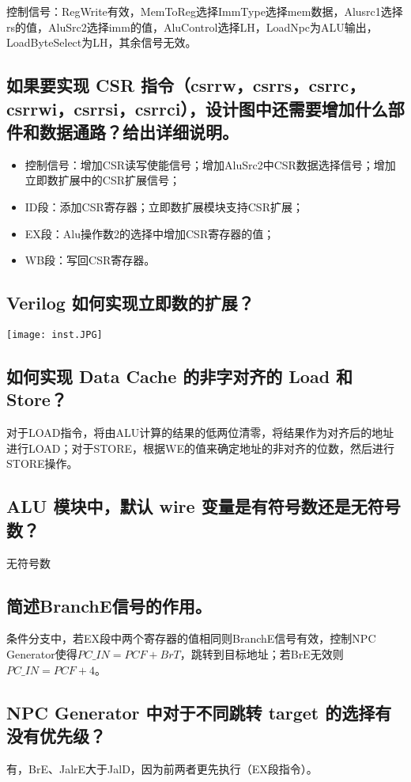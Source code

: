\documentclass[UTF8]{ctexart}
\begin{document}
	控制信号：RegWrite有效，MemToReg选择ImmType选择mem数据，Alusrc1选择rs的值，AluSrc2选择imm的值，AluControl选择LH，LoadNpc为ALU输出，LoadByteSelect为LH，其余信号无效。
	
	\subsection{如果要实现 CSR 指令（csrrw，csrrs，csrrc，csrrwi，csrrsi，csrrci），设计图中还需要增加什么部件和数据通路？给出详细说明。}
	\begin{itemize}
		\item 控制信号：增加CSR读写使能信号；增加AluSrc2中CSR数据选择信号；增加立即数扩展中的CSR扩展信号；
		\item ID段：添加CSR寄存器；立即数扩展模块支持CSR扩展；
		\item EX段：Alu操作数2的选择中增加CSR寄存器的值；
		\item WB段：写回CSR寄存器。
	\end{itemize}

	\subsection{Verilog 如何实现立即数的扩展？}
	\begin{center}
		\texttt{[image: inst.JPG]}\\
	\end{center}

	\subsection{如何实现 Data Cache 的非字对齐的 Load 和 Store？}
	对于LOAD指令，将由ALU计算的结果的低两位清零，将结果作为对齐后的地址进行LOAD；对于STORE，根据WE的值来确定地址的非对齐的位数，然后进行STORE操作。
	
	\subsection{ALU 模块中，默认 wire 变量是有符号数还是无符号数？}
	无符号数
	
	\subsection{简述BranchE信号的作用。}
	条件分支中，若EX段中两个寄存器的值相同则BranchE信号有效，控制NPC Generator使得$PC\_IN=PCF+BrT$，跳转到目标地址；若BrE无效则$PC\_IN=PCF+4$。
	
	\subsection{NPC Generator 中对于不同跳转 target 的选择有没有优先级？}
	有，BrE、JalrE大于JalD，因为前两者更先执行（EX段指令）。
	
\end{document}

